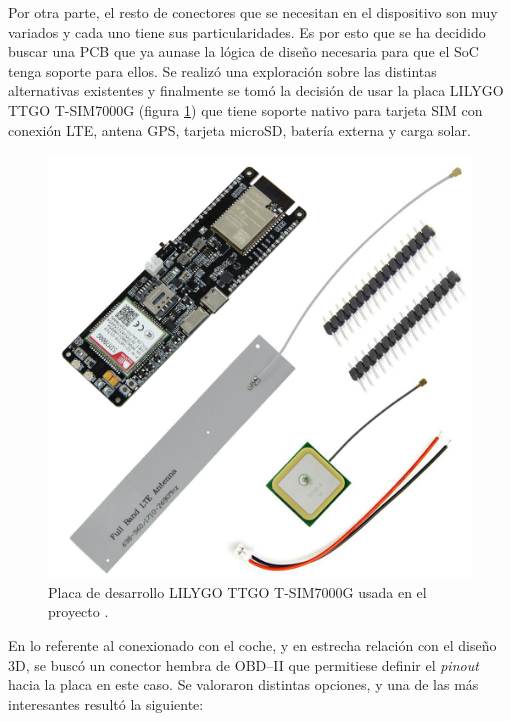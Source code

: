 Por otra parte, el resto de conectores que se necesitan en el dispositivo son muy
variados y cada uno tiene sus particularidades. Es por esto que se ha decidido
buscar una PCB que ya aunase la lógica de diseño necesaria para que el \ac{SoC}
tenga soporte para ellos. Se realizó una exploración sobre las
distintas alternativas existentes y finalmente se tomó la decisión de usar la
placa LILYGO TTGO T-SIM7000G (figura \ref{fig:lilygo}) que tiene soporte nativo
para tarjeta SIM con conexión \ac{LTE}, antena \ac{GPS}, tarjeta microSD, batería
externa y carga solar.

\begin{figure}[H]
  \centering
  \includegraphics[width=\linewidth]{images/lilygo-tsim7000g.jpg}
  \caption{Placa de desarrollo LILYGO TTGO T-SIM7000G usada en el proyecto \cite{4269LILYGO}.}
  \label{fig:lilygo}
\end{figure}

En lo referente al conexionado con el coche, y en estrecha relación con el diseño 3D,
se buscó un conector hembra de \ac{OBD}--II que permitiese definir el \textit{pinout}
hacia la placa en este caso. Se valoraron distintas opciones, y una de las más
interesantes resultó la siguiente:

